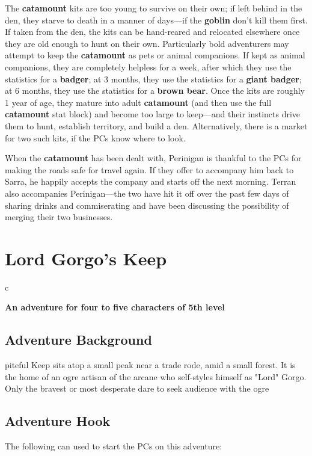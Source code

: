 \documentclass[10pt,a4paper,twoside,bg=print,twocolumn,openany,nodeprecatedcode]{dndbook}
\begin{document}
The \textbf{catamount} kits are too young to survive on their own; if left behind in the den, they starve to death in a manner of days—if the \textbf{goblin} don't kill them first. If taken from the den, the kits can be hand-reared and relocated elsewhere once they are old enough to hunt on their own. Particularly bold adventurers may attempt to keep the \textbf{catamount} as pets or animal companions. If kept as animal companions, they are completely helpless for a week, after which they use the statistics for a \textbf{badger}; at 3 months, they use the statistics for a \textbf{giant badger}; at 6 months, they use the statistics for a \textbf{brown bear}. Once the kits are roughly 1 year of age, they mature into adult \textbf{catamount} (and then use the full \textbf{catamount} stat block) and become too large to keep—and their instincts drive them to hunt, establish territory, and build a den. Alternatively, there is a market for two such kits, if the PCs know where to look.

When the \textbf{catamount} has been dealt with, Perinigan is thankful to the PCs for making the roads safe for travel again. If they offer to accompany him back to Sarra, he happily accepts the company and starts off the next morning. Terran also accompanies Perinigan—the two have hit it off over the past few days of sharing drinks and commiserating and have been discussing the possibility of merging their two businesses.

\chapter{Lord Gorgo's Keep}

\begin{DndTable}{c}

\textbf{An adventure for four to five characters of 5th level}\\
\end{DndTable}

\section{Adventure Background}
piteful Keep sits atop a small peak near a trade rode, amid a small forest. It is the home of an ogre artisan of the arcane who self-styles himself as "Lord" Gorgo. Only the bravest or most desperate dare to seek audience with the ogre


\section{Adventure Hook}
The following can used to start the PCs on this adventure:
\end{document}
